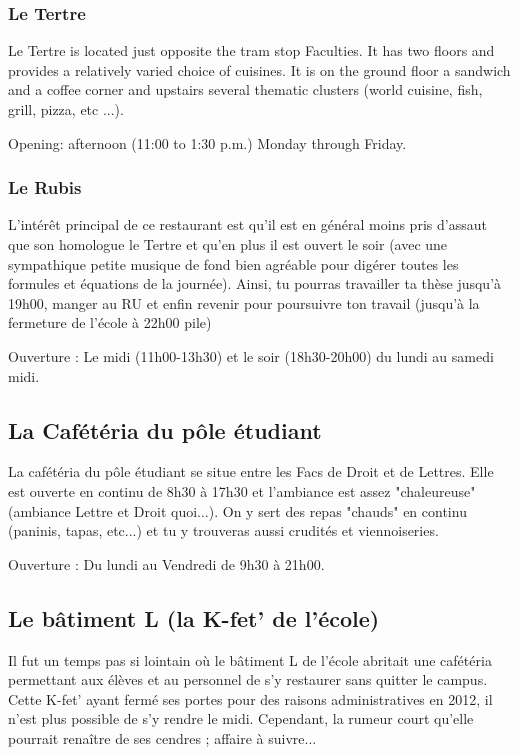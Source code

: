 \subsubsection{Le Tertre}


Le Tertre is located just opposite the tram stop Faculties. It has two floors and provides a relatively varied choice of cuisines.
It is on the ground floor a sandwich and a coffee corner and upstairs several thematic clusters (world cuisine, fish, grill, pizza, etc ...).

Opening: afternoon (11:00 to 1:30 p.m.) Monday through Friday.
\subsubsection{Le Rubis}
L'intérêt principal de ce restaurant est qu'il est en général moins pris d'assaut que son homologue le Tertre et qu'en plus il est ouvert le soir (avec une sympathique petite musique de fond bien agréable pour digérer toutes les formules et équations de la journée).
Ainsi, tu pourras travailler ta thèse jusqu'à 19h00, manger au RU et enfin revenir pour poursuivre ton travail (jusqu'à la fermeture de l'école à 22h00 pile)

Ouverture : Le midi (11h00-13h30) et le soir (18h30-20h00) du lundi au samedi midi.

\subsection{La Cafétéria du pôle étudiant}
La cafétéria du pôle étudiant se situe entre les Facs de Droit et de Lettres.
Elle est ouverte en continu de 8h30 à 17h30 et l'ambiance est assez "chaleureuse" (ambiance Lettre et Droit quoi...).
On y sert des repas "chauds" en continu (paninis, tapas, etc...) et tu y trouveras aussi crudités et viennoiseries.

Ouverture : Du lundi au Vendredi de 9h30 à 21h00.

\subsection{Le bâtiment L (la K-fet' de l'école)}
Il fut un temps pas si lointain où le bâtiment L de l'école abritait une cafétéria permettant aux élèves et au personnel de s'y restaurer sans quitter le campus.
Cette K-fet' ayant fermé ses portes pour des raisons administratives en 2012, il n'est plus possible de s'y rendre le midi.
Cependant, la rumeur court qu'elle pourrait renaître de ses cendres ; affaire à suivre...

